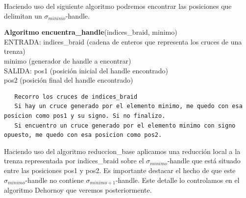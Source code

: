Haciendo uso del siguiente algoritmo podremos encontrar las posiciones que delimitan un $\sigma_{minimo}$-handle.
\begin{alg}
	\textbf{Algoritmo encuentra\_handle}(indices\_braid, minimo)\\
	ENTRADA: indices\_braid (cadena de enteros que representa los cruces de una trenza)\\
	\hspace*{2.2cm} minimo (generador de handle a encontrar) \\
	SALIDA: \hspace{0.4cm} pos1 (posición inicial del handle encontrado) \\
	\hspace*{2.2cm} pos2 (posición final del handle encontrado)
	
\begin{lstlisting}
   Recorro los cruces de indices_braid
   Si hay un cruce generado por el elemento minimo, me quedo con esa posicion como pos1 y su signo. Si no finalizo.
   Si encuentro un cruce generado por el elemento minimo con signo opuesto, me quedo con esa posicion como pos2.
\end{lstlisting}
\end{alg}

\bigskip
Haciendo uso del algoritmo reduccion\_base aplicamos una reducción local a la trenza representada por indices\_braid sobre el $\sigma_{minimo}$-handle que está situado entre las posiciones pos1 y pos2. Es importante destacar el hecho de que este $\sigma_{minimo}$-handle  no contiene $\sigma_{minimo+1}$-handle. Este detalle lo controlamos en el algoritmo Dehornoy que veremos posteriormente. \\

